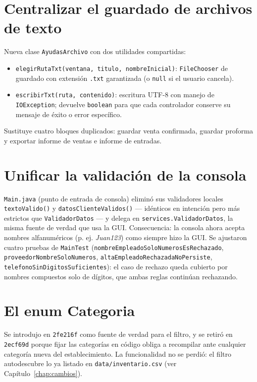 \section{Centralizar el guardado de archivos de texto}
Nueva clase \texttt{AyudasArchivo} con dos utilidades compartidas:
\begin{itemize}
\item \texttt{elegirRutaTxt(ventana, titulo, nombreInicial)}: \texttt{FileChooser} de guardado con extensión \texttt{.txt} garantizada (o \texttt{null} si el usuario cancela).
\item \texttt{escribirTxt(ruta, contenido)}: escritura UTF-8 con manejo de \texttt{IOException}; devuelve \texttt{boolean} para que cada controlador conserve su mensaje de éxito o error específico.
\end{itemize}
Sustituye cuatro bloques duplicados: guardar venta confirmada, guardar proforma y exportar informe de ventas e informe de entradas.

\section{Unificar la validación de la consola}
\texttt{Main.java} (punto de entrada de consola) eliminó sus validadores locales \texttt{textoValido()} y \texttt{datosClienteValidos()} — idénticos en intención pero más estrictos que \texttt{ValidadorDatos} — y delega en \texttt{services.ValidadorDatos}, la misma fuente de verdad que usa la GUI. Consecuencia: la consola ahora acepta nombres alfanuméricos (p. ej. \emph{Juan123}) como siempre hizo la GUI. Se ajustaron cuatro pruebas de \texttt{MainTest} (\texttt{nombreEmpleadoSoloNumerosEsRechazado}, \texttt{proveedorNombreSoloNumeros}, \texttt{altaEmpleadoRechazadaNoPersiste}, \texttt{telefonoSinDigitosSuficientes}): el caso de rechazo queda cubierto por nombres compuestos solo de dígitos, que ambas reglas continúan rechazando.

\section{El enum Categoria}
Se introdujo en \texttt{2fe216f} como fuente de verdad para el filtro, y se retiró en \texttt{2ecf69d} porque fijar las categorías en código obliga a recompilar ante cualquier categoría nueva del establecimiento. La funcionalidad no se perdió: el filtro autodescubre lo ya listado en \texttt{data/inventario.csv} (ver Capítulo~\ref{chap:cambios}).
